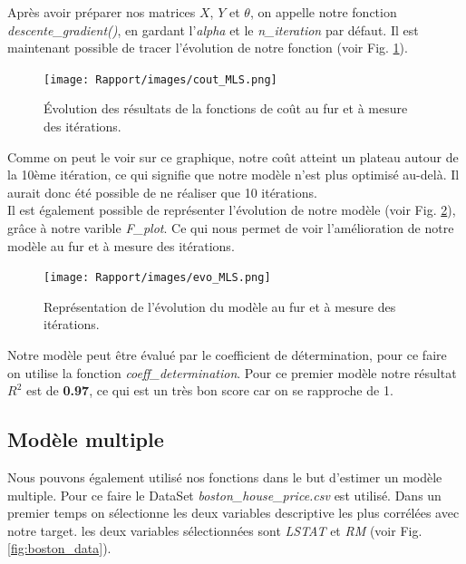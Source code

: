 \documentclass[french]{article}
\begin{document}
\noindent Après avoir préparer nos matrices $X$, $Y$ et $\theta$, on appelle notre fonction \textit{descente\_gradient()}, en gardant l'\textit{alpha} et le \textit{n\_iteration} par défaut. Il est maintenant possible de tracer l'évolution de notre fonction (voir Fig. \ref{fig:JMLS}). 

\begin{figure}[!htbp]
    \centering
    \texttt{[image: Rapport/images/cout\_MLS.png]}
    \caption{Évolution des résultats de la fonctions de coût au fur et à mesure des itérations.}
    \label{fig:JMLS}
\end{figure}

Comme on peut le voir sur ce graphique, notre coût atteint un plateau autour de la 10ème itération, ce qui signifie que notre modèle n'est plus optimisé au-delà. Il aurait donc été possible de ne réaliser que 10 itérations.\\

Il est également possible de représenter l'évolution de notre modèle (voir Fig. \ref{fig:evo_MLS}), grâce à notre varible \textit{F\_plot}. Ce qui nous permet de voir l'amélioration de notre modèle au fur et à mesure des itérations.\\

\begin{figure}[!htbp]
    \centering
    \texttt{[image: Rapport/images/evo\_MLS.png]}
    \caption{Représentation de l'évolution du modèle au fur et à mesure des itérations.}
    \label{fig:evo_MLS}
\end{figure}

Notre modèle peut être évalué par le coefficient de détermination, pour ce faire on utilise la fonction \textit{coeff\_determination}. Pour ce premier modèle notre résultat $R^{2}$ est de \textbf{0.97}, ce qui est un très bon score car on se rapproche de 1.

\subsection{Modèle multiple}

Nous pouvons également utilisé nos fonctions dans le but d'estimer un modèle multiple. Pour ce faire le DataSet \textit{boston\_house\_price.csv} est utilisé. Dans un premier temps on sélectionne les deux variables descriptive les plus corrélées avec notre target. les deux variables sélectionnées sont \textit{LSTAT} et \textit{RM} (voir Fig. \ref{fig:boston_data}).\\
\end{document}
